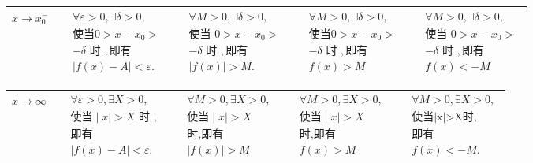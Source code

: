 \documentclass[12pt, a4paper, oneside, UTF8]{ctexbook}  %
\begin{document}
\begin{sloppypar}
\begin{center}
\begin{supertabular}{|c|c|c|c|c|}
            $x \to x_0^-$     & $\begin{aligned}&\forall\varepsilon>0,\exists\delta>0, \\&\text{使当}0>x-x_{0}> \\&-\delta\text{ 时 },\text{即有} \\&|f(x)-A|<\varepsilon.\end{aligned}$         & $\begin{aligned}&\forall M>0,\exists\delta>0, \\&\text{使当 }0>x-x_{0}> \\&-\delta\text{ 时 },\text{即有} \\&|f(x)|>M.\end{aligned}$         & $\begin{aligned}&\forall M>0,\exists\delta>0, \\&\text{使当}0>x-x_{0}> \\&-\delta\text{ 时 },\text{即有}\\& f(x) >M\end{aligned}$ & $\begin{aligned}&\forall M>0,\exists\delta>0, \\&\text{使当 }0>x-x_{0}> \\&-\delta\text{ 时 },\text{即有}\\&f(x) <-M\end{aligned}$    \\ \hline
        \end{supertabular}
        \begin{supertabular}{|c|c|c|c|c|}
            \hline
            $x\to \infty$     & $\begin{aligned}&\forall\varepsilon>0,\exists X>0, \\&\text{使当}\mid x\mid>X\text{ 时 }, \\&\text{即有} \\&|f(x)-A|<\varepsilon.\end{aligned}$                  & $\begin{aligned}&\forall M>0,\exists X>0,\\& \text{使当}\mid x\mid>X \\&\text{时,即有}\\&|f(x)|>M\end{aligned}$                              & $\begin{aligned}&\forall M>0,\exists X>0, \\&\text{使当}\mid x\mid>X \\&\text{时,即有}\\& f(x)>M\end{aligned}$                    & $\begin{aligned}&\forall M>0,\exists X>0, \\&\text{使当|x|>X时,} \\&\text{即有} \\&f(x)<-M.\end{aligned}$                             \\ \hline

\end{supertabular}
\end{center}
\end{sloppypar}
\end{document}
